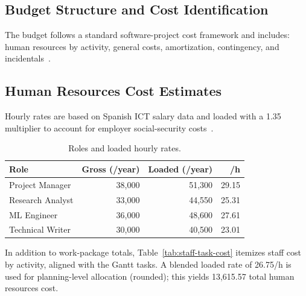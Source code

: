 \documentclass[11pt, a4paper]{article}
\begin{document}
\subsection{Budget Structure and Cost Identification}
The budget follows a standard software-project cost framework and includes: human resources by activity, general costs, amortization, contingency, and incidentals~\cite{gepModule24EconomicManagement}.

\subsection{Human Resources Cost Estimates}
Hourly rates are based on Spanish ICT salary data and loaded with a 1.35 multiplier to account for employer social-security costs~\cite{ineEncuestaEstructuraSalarial2023,segSocialCotizacion2025}.

\begin{table}[h!]
    \centering
    \caption{Roles and loaded hourly rates.}
    \label{tab:roles-cost}
    \renewcommand{\arraystretch}{1.1}
    \begin{tabularx}{\linewidth}{l r r r}
        \toprule
        \textbf{Role} & \textbf{Gross (\EUR{}/year)} & \textbf{Loaded (\EUR{}/year)} & \textbf{\EUR{}/h} \\
        \midrule
        Project Manager   & 38,000 & 51,300 & 29.15 \\
        Research Analyst  & 33,000 & 44,550 & 25.31 \\
        ML Engineer       & 36,000 & 48,600 & 27.61 \\
        Technical Writer  & 30,000 & 40,500 & 23.01 \\
        \bottomrule
    \end{tabularx}
\end{table}

In addition to work-package totals, Table~\ref{tab:staff-task-cost} itemizes staff cost by activity, aligned with the Gantt tasks. A blended loaded rate of \EUR{}26.75/h is used for planning-level allocation (rounded); this yields \EUR{}13,615.57 total human resources cost.
\end{document}

